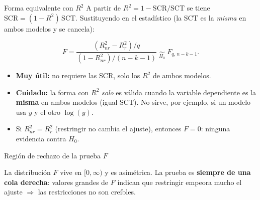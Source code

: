 \documentclass{beamer}
\begin{document}
\begin{frame}{Forma equivalente con $R^2$}
A partir de $R^2 = 1 - \text{SCR}/\text{SCT}$ se tiene $\text{SCR} = (1-R^2)\,\text{SCT}$. Sustituyendo en el estadístico (la $\text{SCT}$ es la \emph{misma} en ambos modelos y se cancela):

\begin{tcolorbox}[colback=blue!5!white, colframe=blue!75!black, title=Estadístico $F$ (forma $R^2$)]
\[
   F = \frac{(R^2_{nr} - R^2_{r})/q}{(1 - R^2_{nr})/(n-k-1)} \;\underset{H_0}{\sim}\; F_{q,\,n-k-1}.
\]
\end{tcolorbox}

\begin{itemize}
    \item \textbf{Muy útil:} no requiere las SCR, solo los $R^2$ de ambos modelos.
    \pause
    \item \textbf{Cuidado:} la forma con $R^2$ \emph{solo} es válida cuando la variable dependiente es la \textbf{misma} en ambos modelos (igual $\text{SCT}$). No sirve, por ejemplo, si un modelo usa $y$ y el otro $\log(y)$.
    \pause
    \item Si $R^2_{nr} = R^2_{r}$ (restringir no cambia el ajuste), entonces $F=0$: ninguna evidencia contra $H_0$.
\end{itemize}
\end{frame}

\begin{frame}{Región de rechazo de la prueba $F$}
\begin{figure}
\centering
{}
\end{figure}
{\small La distribución $F$ vive en $[0,\infty)$ y es asimétrica. La prueba es \textbf{siempre de una cola derecha}: valores grandes de $F$ indican que restringir empeora mucho el ajuste $\Rightarrow$ las restricciones no son creíbles.}
\end{frame}
\end{document}
